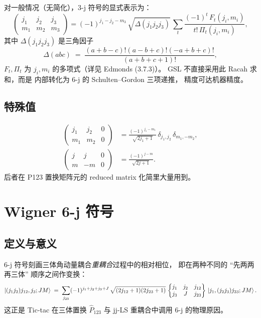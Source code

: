 对一般情况（无简化），3-j 符号的显式表示为：
\begin{equation}
\begin{pmatrix} j_1 & j_2 & j_3 \\ m_1 & m_2 & m_3 \end{pmatrix}
= (-1)^{j_1-j_2-m_3}\,
\sqrt{\Delta(j_1 j_2 j_3)}\,
\sum_t \frac{(-1)^t\,F_t(j_i, m_i)}
            {t!\,\Pi_t(j_i, m_i)},
\end{equation}
其中 $\Delta(j_1 j_2 j_3)$ 是三角因子
\begin{equation}
\Delta(abc) \;=\; \frac{(a+b-c)!(a-b+c)!(-a+b+c)!}{(a+b+c+1)!},
\end{equation}
$F_t, \Pi_t$ 为 $j_i, m_i$ 的多项式（详见 Edmonds (3.7.3)\cite{Edmonds1957}）。
GSL 不直接采用此 Racah 求和，而是
内部转化为 6-j 的 Schulten–Gordon 三项递推，
精度可达机器精度。

\subsection{特殊值}

\begin{align}
\begin{pmatrix} j_1 & j_2 & 0 \\ m_1 & m_2 & 0 \end{pmatrix}
&= \frac{(-1)^{j_1 - m_1}}{\sqrt{2 j_1 + 1}}\,\delta_{j_1, j_2}\,\delta_{m_1, -m_2}, \\
\begin{pmatrix} j & j & 0 \\ m & -m & 0 \end{pmatrix}
&= \frac{(-1)^{j - m}}{\sqrt{2 j + 1}}.
\end{align}
后者在 P123 置换矩阵元的 reduced matrix 化简里大量用到。

\section{Wigner 6-j 符号}
\label{sec:appB_6j}

\subsection{定义与意义}

6-j 符号刻画三体角动量耦合\emph{重耦合}过程中的相对相位，
即在两种不同的 “先两两再三体” 顺序之间作变换：
\begin{equation}
\ket{(j_1 j_2) j_{12}, j_3; J M}
\;=\;
\sum_{j_{23}} (-1)^{j_1+j_2+j_3+J}\,\sqrt{(2 j_{12}+1)(2 j_{23}+1)}
\,
\begin{Bmatrix} j_1 & j_2 & j_{12} \\ j_3 & J & j_{23} \end{Bmatrix}\,
\ket{j_1, (j_2 j_3) j_{23}; J M}.
\label{eq:appB_6j_recoupling}
\end{equation}
这正是 Tic-tac 在三体置换 $\hat{P}_{123}$ 与 jj-LS 重耦合中调用 6-j 的物理原因。

